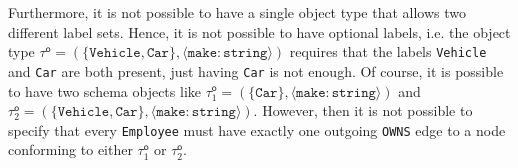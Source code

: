 \documentclass[a4paper]{article}
\newcommand{\otype}{\tau^\mathsf{o}}
\begin{document}


Furthermore, it is not possible to have a single object type that allows two different label sets. Hence, it is not possible to have optional labels, i.e. the object type $\otype = (\{\texttt{Vehicle}, \texttt{Car}\}, \langle \texttt{make} : \texttt{string} \rangle)$ requires that the labels \texttt{Vehicle} and \texttt{Car} are both present, just having \texttt{Car} is not enough. Of course, it is possible to have two schema objects like $\otype_1 = (\{\texttt{Car}\}, \langle \texttt{make} : \texttt{string} \rangle)$ and $\otype_2 = (\{\texttt{Vehicle}, \texttt{Car}\}, \langle \texttt{make} : \texttt{string} \rangle)$. However, then it is not possible to specify that every \texttt{Employee} must have exactly one outgoing \texttt{OWNS} edge to a node conforming to either $\otype_1$ or $\otype_2$.

\end{document}
